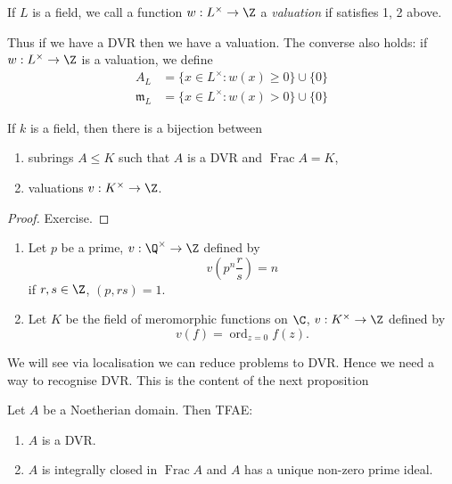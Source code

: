 \documentclass[a4paper]{article}
\DeclareMathOperator{\Frac}{Frac}
\begin{document}
\begin{definition}[valuation]
  If \(L\) is a field, we call a function \(w: L^\times \to \Z\) a \emph{valuation} if satisfies 1, 2 above.
\end{definition}

Thus if we have a DVR then we have a valuation. The converse also holds: if \(w: L^\times \to \Z\) is a valuation, we define
\begin{align*}
  A_L &= \{x \in L^\times: w(x) \geq 0\} \cup \{0\} \\
  \mathfrak m_L &= \{x \in L^\times: w(x) > 0\} \cup \{0\}
\end{align*}

\begin{lemma}
  If \(k\) is a field, then there is a bijection between
  \begin{enumerate}
  \item subrings \(A \leq K\) such that \(A\) is a DVR and \(\Frac A = K\),
  \item valuations \(v: K^\times \to \Z\).
  \end{enumerate}
\end{lemma}

\begin{proof}
  Exercise.
\end{proof}

\begin{eg}\leavevmode
  \begin{enumerate}
  \item Let \(p\) be a prime, \(v: \Q^\times \to \Z\) defined by
    \[
      v(p^n \frac{r}{s}) = n
    \]
    if \(r, s \in \Z\), \((p, rs) = 1\).
  \item Let \(K\) be the field of meromorphic functions on \(\C\), \(v: K^\times \to \Z\) defined by
    \[
      v(f) = \operatorname{ord}_{z = 0} f(z).
    \]
  \end{enumerate}
\end{eg}

We will see via localisation we can reduce problems to DVR. Hence we need a way to recognise DVR. This is the content of the next proposition

\begin{proposition}
  Let \(A\) be a Noetherian domain. Then TFAE:
  \begin{enumerate}
  \item \(A\) is a DVR.
  \item \(A\) is integrally closed in \(\Frac A\) and \(A\) has a unique non-zero prime ideal.
  \end{enumerate}
\end{proposition}
\end{document}
